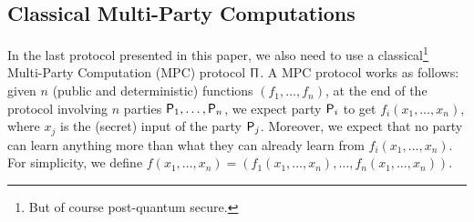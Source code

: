 \subsection{Classical Multi-Party Computations}\label{subsec:MPC}

In the last protocol presented in this paper, we also need to use a classical\footnote{But of course post-quantum secure.} Multi-Party Computation (MPC) protocol $\Uppi$. A MPC protocol works as follows: given $n$ (public and deterministic) functions $(f_1,\dots,f_n)$, at the end of the protocol involving $n$ parties $\P{}_1,\dots,\P{}_n$, we expect party $\P{}_i$ to get $f_i(x_1,\dots,x_n)$, where $x_j$ is the (secret) input of the party $\P{}_j$. Moreover, we expect that no party can learn anything more than what they can already learn from $f_i(x_1,\dots,x_n)$. For simplicity, we define $f(x_1,\dots,x_n) = (f_1(x_1,\dots,x_n),\dots,f_n(x_1,\dots,x_n))$.

